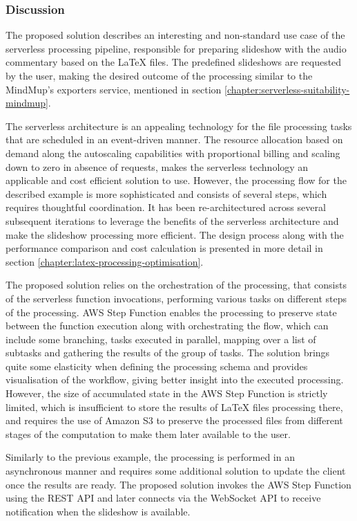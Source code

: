 \subsubsection{Discussion}

The proposed solution describes an interesting and non-standard use case of the serverless processing pipeline, responsible for preparing slideshow with the audio commentary based on the LaTeX files.
The predefined slideshows are requested by the user, making the desired outcome of the processing similar to the MindMup’s exporters service, mentioned in section \ref{chapter:serverless-suitability-mindmup}.

The serverless architecture is an appealing technology for the file processing tasks that are scheduled in an event-driven manner.
The resource allocation based on demand along the autoscaling capabilities with proportional billing and scaling down to zero in absence of requests, makes the serverless technology an applicable and cost efficient solution to use.
However, the processing flow for the described example is more sophisticated and consists of several steps, which requires thoughtful coordination.
It has been re-architectured across several subsequent iterations to leverage the benefits of the serverless architecture and make the slideshow processing more efficient.
The design process along with the performance comparison and cost calculation is presented in more detail in section \ref{chapter:latex-processing-optimisation}.

The proposed solution relies on the orchestration of the processing, that consists of the serverless function invocations, performing various tasks on different steps of the processing.
AWS Step Function enables the processing to preserve state between the function execution along with orchestrating the flow, which can include some branching, tasks executed in parallel, mapping over a list of subtasks and gathering the results of the group of tasks.
The solution brings quite some elasticity when defining the processing schema and provides visualisation of the workflow, giving better insight into the executed processing.
However, the size of accumulated state in the AWS Step Function is strictly limited, which is insufficient to store the results of LaTeX files processing there, and requires the use of Amazon S3 to preserve the processed files from different stages of the computation to make them later available to the user.

Similarly to the previous example, the processing is performed in an asynchronous manner and requires some additional solution to update the client once the results are ready. The proposed solution invokes the AWS Step Function using the REST API and later connects via the WebSocket API to receive notification when the slideshow is available.

